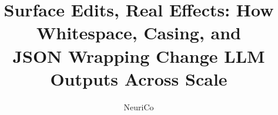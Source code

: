 \documentclass{article}
\title{Surface Edits, Real Effects: How Whitespace, Casing, and\\ JSON Wrapping Change LLM Outputs Across Scale}
\author{NeuriCo}
\begin{document}
\maketitle

\begin{abstract}

\end{abstract}










\appendix

\end{document}
